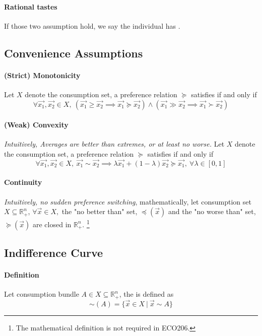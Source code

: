 \documentclass{article}
\begin{document}
\paragraph{Rational tastes} If those two assumption hold, we say the individual has .

\subsection{Convenience Assumptions}
\paragraph{(Strict) Monotonicity} Let $X$ denote the consumption set, a preference relation $\succcurlyeq$ satisfies  if and only if
\[
	\forall \vec{x_1}, \vec{x_2} \in X,\ (\vec{x_1} \geq \vec{x_2} \implies \vec{x_1} \succcurlyeq \vec{x_2}) \land (\vec{x_1} \gg \vec{x_2} \implies \vec{x_1} \succ \vec{x_2})
\]

\paragraph{(Weak) Convexity} \emph{Intuitively, Averages are better than extremes, or at least
no worse.} Let $X$ denote the consumption set, a preference relation $\succcurlyeq$ satisfies
 if and only if
\[
	\forall \vec{x_1}, \vec{x_2} \in X,\ \vec{x_1} \sim \vec{x_2} \implies \lambda \vec{x_1} + (1 - \lambda) \vec{x_2} \succcurlyeq \vec{x_1},\ \forall \lambda \in [0, 1]
\]

\paragraph{Continuity} \emph{Intuitively, no sudden preference switching},  mathematically, let consumption set $X \subseteq \mathbb{R}^n_{+}$, $\forall \vec{x} \in X,$ the "no better than" set, $\preccurlyeq(\vec{x})$ and the "no worse than" set, $\succcurlyeq(\vec{x})$ are closed in $\mathbb{R}^n_{+}$. \footnote{The mathematical definition is not required in ECO206.}

\subsection{Indifference Curve}
\paragraph{Definition} Let consumption bundle $A \in X \subseteq \mathbb{R}^n_{+}$, the   is defined as
\[
	\sim(A) = \{\vec{x} \in X\ \vert\ \vec{x} \sim A\}
\]
\end{document}
